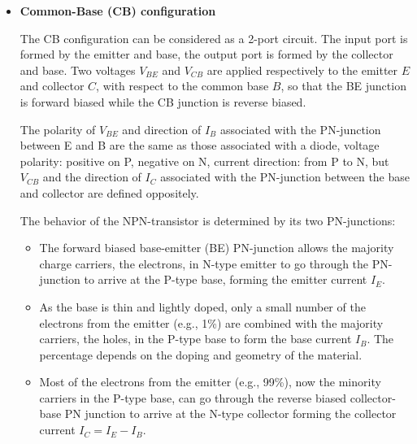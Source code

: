 \documentclass{article}
\begin{document}

\begin{itemize}
\item {\bf Common-Base (CB) configuration}

  The CB configuration can be considered as a 2-port circuit. The input
  port is formed by the emitter and base, the output port is formed by 
  the collector and base. Two voltages $V_{BE}$ and $V_{CB}$ are applied 
  respectively to the emitter $E$ and collector $C$, with respect to the 
  common base $B$, so that the BE junction is forward biased while the
  CB junction is reverse biased.

    


  The polarity of $V_{BE}$ and direction of $I_B$ associated with the
  PN-junction between E and B are the same as those associated with 
  a diode, voltage polarity: positive on P, negative on N, current 
  direction: from P to N, but $V_{CB}$ and the direction of $I_C$ 
  associated with the PN-junction between the base and collector are 
  defined oppositely. 

  The behavior of the NPN-transistor is determined by its two PN-junctions:

  \begin{itemize}
  \item The forward biased base-emitter (BE) PN-junction allows the 
    majority charge carriers, the electrons, in N-type emitter to go 
    through the PN-junction to arrive at the P-type base, forming the 
    emitter current $I_E$.

  \item As the base is thin and lightly doped, only a small number of 
    the electrons from the emitter (e.g., 1\%) are combined with the 
    majority carriers, the holes, in the P-type base to form the base 
    current $I_B$. The percentage depends on the doping and geometry 
    of the material.
    
  \item Most of the electrons from the emitter (e.g., 99\%), now the
    minority carriers in the P-type base, can go through the reverse 
    biased collector-base PN junction to arrive at the N-type collector
    forming the collector current $I_C=I_E-I_B$.

  \end{itemize}


\end{itemize}
\end{document}
